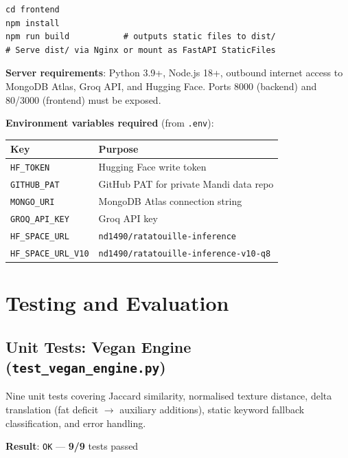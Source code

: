 \documentclass[12pt, a4paper]{article}
\begin{document}
\begin{lstlisting}[style=bash, caption={Frontend build and serve on CoSyLab server.}]
cd frontend
npm install
npm run build           # outputs static files to dist/
# Serve dist/ via Nginx or mount as FastAPI StaticFiles
\end{lstlisting}

\noindent\textbf{Server requirements}: Python 3.9+, Node.js 18+, outbound internet access to
MongoDB Atlas, Groq API, and Hugging Face.  Ports 8000 (backend) and 80/3000 (frontend)
must be exposed.

\noindent\textbf{Environment variables required} (from \texttt{.env}):
\begin{table}[H]
\centering
\begin{tabular}{l l}
\toprule
\textbf{Key} & \textbf{Purpose} \\
\midrule
\texttt{HF\_TOKEN}         & Hugging Face write token \\
\texttt{GITHUB\_PAT}       & GitHub PAT for private Mandi data repo \\
\texttt{MONGO\_URI}        & MongoDB Atlas connection string \\
\texttt{GROQ\_API\_KEY}    & Groq API key \\
\texttt{HF\_SPACE\_URL}    & \texttt{nd1490/ratatouille-inference} \\
\texttt{HF\_SPACE\_URL\_V10}& \texttt{nd1490/ratatouille-inference-v10-q8} \\
\bottomrule
\end{tabular}
\end{table}

\section{Testing and Evaluation}

\subsection{Unit Tests: Vegan Engine (\texttt{test\_vegan\_engine.py})}

Nine unit tests covering Jaccard similarity, normalised texture distance, delta translation
(fat deficit $\rightarrow$ auxiliary additions), static keyword fallback classification, and
error handling.

\begin{center}
\textbf{Result}: \texttt{OK} --- \textbf{9/9} tests passed
\end{center}
\end{document}
